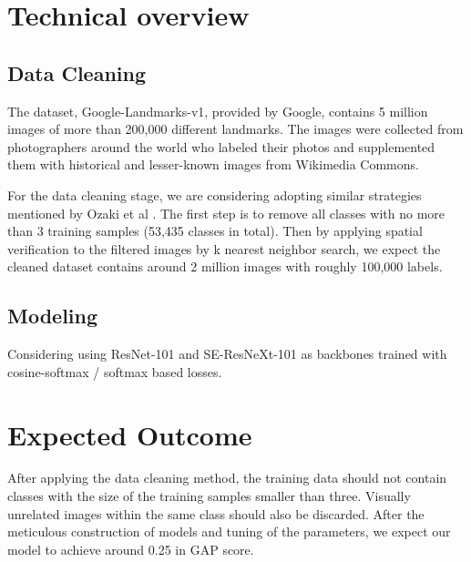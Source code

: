 \documentclass[10pt,twocolumn,letterpaper]{article}
\begin{document}
\section{Technical overview}


\subsection{Data Cleaning}

The dataset, Google-Landmarks-v1, provided by Google, contains 5 million images of more than 200,000 different landmarks. The images were collected from photographers around the world who labeled their photos and supplemented them with historical and lesser-known images from Wikimedia Commons.

For the data cleaning stage, we are considering adopting similar strategies mentioned by Ozaki et al \cite{Ozaki2019LargescaleLR}. The first step is to remove all classes with no more than 3 training samples (53,435 classes in total). Then by applying spatial verification to the filtered images by k nearest neighbor search, we expect the cleaned dataset contains around 2 million images with roughly 100,000 labels.

\subsection{Modeling}
Considering using ResNet-101 and SE-ResNeXt-101 as backbones trained with cosine-softmax / softmax based losses.



\section{Expected Outcome}
After applying the data cleaning method, the training data should not contain classes with the size of the training samples smaller than three. Visually unrelated images within the same class should also be discarded. After the meticulous construction of models and tuning of the parameters, we expect our model to achieve around 0.25 in GAP score.  



%
% 
%
%
{\small


}
\end{document}
